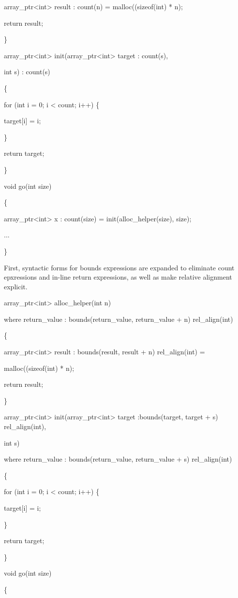 \documentclass[]{article}
\begin{document}
array\_ptr\textless{}int\textgreater{} result : count(n) =
malloc((sizeof(int) * n);

return result;

\}

array\_ptr\textless{}int\textgreater{}
init(array\_ptr\textless{}int\textgreater{} target : count(s),

int s) : count(s)

\{

for (int i = 0; i \textless{} count; i++) \{

target{[}i{]} = i;

\}

return target;

\}

void go(int size)

\{

array\_ptr\textless{}int\textgreater{} x : count(size) =
init(alloc\_helper(size), size);

...

\}

First, syntactic forms for bounds expressions are expanded to eliminate
count epxressions and in-line return expressions, as well as make
relative alignment explicit.

array\_ptr\textless{}int\textgreater{} alloc\_helper(int n)

where return\_value : bounds(return\_value, return\_value + n)
rel\_align(int)

\{

array\_ptr\textless{}int\textgreater{} result : bounds(result, result +
n) rel\_align(int) =

malloc((sizeof(int) * n);

return result;

\}

array\_ptr\textless{}int\textgreater{}
init(array\_ptr\textless{}int\textgreater{} target :bounds(target,
target + s) rel\_align(int),

int s)

where return\_value : bounds(return\_value, return\_value + s)
rel\_align(int)

\{

for (int i = 0; i \textless{} count; i++) \{

target{[}i{]} = i;

\}

return target;

\}

void go(int size)

\{
\end{document}
